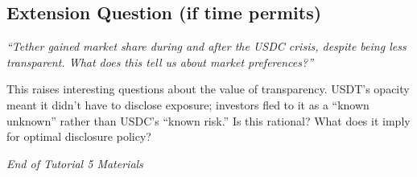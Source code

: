 \documentclass[11pt]{article}
\begin{document}
\subsection*{Extension Question (if time permits)}

\textit{``Tether gained market share during and after the USDC crisis, despite being less transparent. What does this tell us about market preferences?''}

\medskip
This raises interesting questions about the value of transparency. USDT's opacity meant it didn't have to disclose exposure; investors fled to it as a ``known unknown'' rather than USDC's ``known risk.'' Is this rational? What does it imply for optimal disclosure policy?

\vfill
\begin{flushright}
\textit{End of Tutorial 5 Materials}
\end{flushright}
\end{document}
